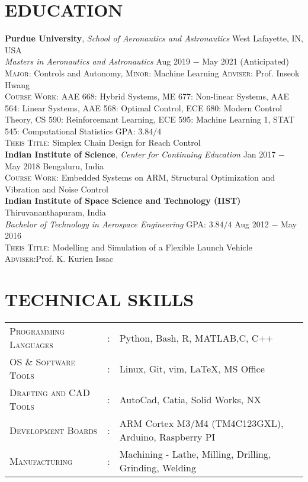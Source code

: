 \documentclass[letterpaper,11pt]{article}
\begin{document}
\section{EDUCATION}
\noindent \textbf{Purdue University}, \textit{School of Aeronautics and Astronautics} \hfill West Lafayette, IN, USA \\
\textit{Masters in Aeronautics and Astronautics} \hfill Aug 2019 $-$ May 2021 (Anticipated)\\
\textsc{Major}: Controls and Autonomy, \textsc{Minor}: Machine Learning \hfill \textsc{Adviser}: Prof. Inseok Hwang\\
\textsc{Course Work}: AAE 668: Hybrid Systems, ME 677: Non-linear Systems, AAE 564: Linear Systems,  AAE 568: Optimal Control, ECE 680: Modern Control Theory, CS 590: Reinforcemant Learning, ECE 595: Machine Learning 1, STAT 545: Computational Statistics
\hfill \textsc{GPA}: $3.84/4$\\
\textsc{Theis Title}: Simplex Chain Design for Reach Control \\

\vspace{5pt}
\noindent \textbf{Indian Institute of Science}, \textit{Center for Continuing Education} \hfill Jan 2017 $-$ May 2018  \hfill Bengaluru, India \\
\textsc{Course Work:} Embedded Systems on ARM, Structural Optimization and Vibration and Noise Control \\

\vspace{5pt}
\noindent \textbf{Indian Institute of Space Science and Technology (IIST)} \hfill Thiruvananthapuram, India\\
\textit{Bachelor of Technology in Aerospace Engineering} \hfill \textsc{GPA}: $3.84/4$ \hfill Aug 2012 $-$ May 2016 \\
\textsc{Theis Title}: Modelling and Simulation of a Flexible Launch Vehicle
\hfill \textsc{Adviser}:Prof. K. Kurien Issac \\


\section{TECHNICAL SKILLS}
\begin{tabular}{l c l}
	\textsc{Programming Languages}&:& Python, Bash, R, MATLAB,C, C++ \\
	\textsc{OS \& Software Tools}&:& Linux, Git, vim, \LaTeX, MS Office\\
    \textsc{Drafting and CAD Tools}&:& AutoCad, Catia, Solid Works, NX\\
    \textsc{Development Boards}&:& ARM Cortex M3/M4 (TM4C123GXL), Arduino, Raspberry PI\\
	\textsc{Manufacturing}&:& Machining - Lathe, Milling, Drilling, Grinding,
	Welding\\
\end{tabular}
\end{document}
